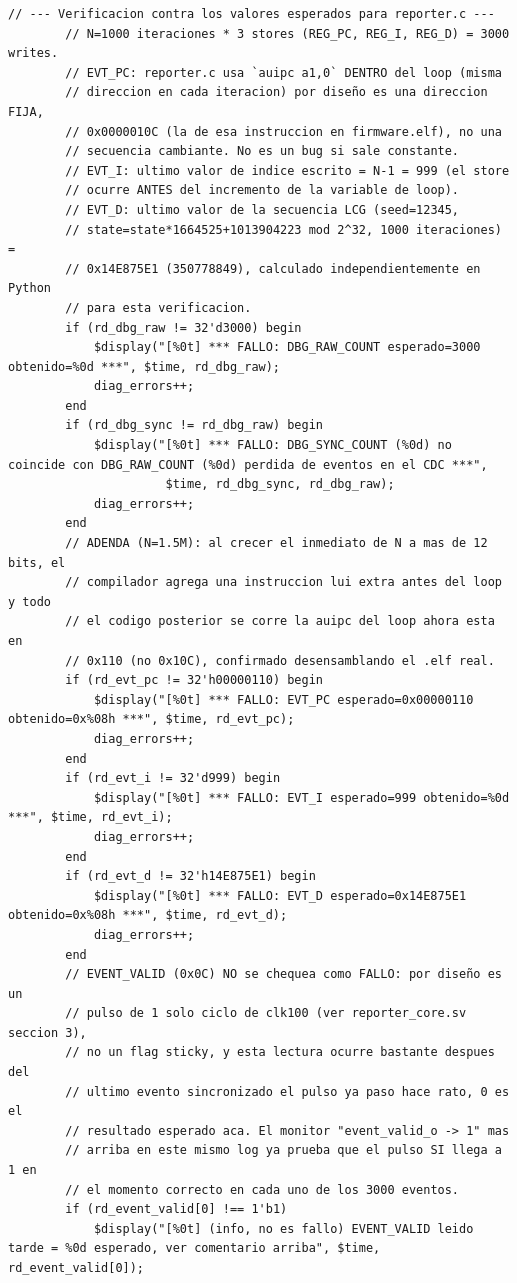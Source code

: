 \begin{lstlisting}[style=verilogstyle, basicstyle=\ttfamily\footnotesize, caption={Código fuente del subsistema \texttt{tb\_ibex\_bram\_subsystem.sv}}, label={code:tb_ibex_bram_subsystem.sv}]
        // --- Verificacion contra los valores esperados para reporter.c ---
        // N=1000 iteraciones * 3 stores (REG_PC, REG_I, REG_D) = 3000 writes.
        // EVT_PC: reporter.c usa `auipc a1,0` DENTRO del loop (misma
        // direccion en cada iteracion) por diseño es una direccion FIJA,
        // 0x0000010C (la de esa instruccion en firmware.elf), no una
        // secuencia cambiante. No es un bug si sale constante.
        // EVT_I: ultimo valor de indice escrito = N-1 = 999 (el store
        // ocurre ANTES del incremento de la variable de loop).
        // EVT_D: ultimo valor de la secuencia LCG (seed=12345,
        // state=state*1664525+1013904223 mod 2^32, 1000 iteraciones) =
        // 0x14E875E1 (350778849), calculado independientemente en Python
        // para esta verificacion.
        if (rd_dbg_raw != 32'd3000) begin
            $display("[%0t] *** FALLO: DBG_RAW_COUNT esperado=3000 obtenido=%0d ***", $time, rd_dbg_raw);
            diag_errors++;
        end
        if (rd_dbg_sync != rd_dbg_raw) begin
            $display("[%0t] *** FALLO: DBG_SYNC_COUNT (%0d) no coincide con DBG_RAW_COUNT (%0d) perdida de eventos en el CDC ***",
                      $time, rd_dbg_sync, rd_dbg_raw);
            diag_errors++;
        end
        // ADENDA (N=1.5M): al crecer el inmediato de N a mas de 12 bits, el
        // compilador agrega una instruccion lui extra antes del loop y todo
        // el codigo posterior se corre la auipc del loop ahora esta en
        // 0x110 (no 0x10C), confirmado desensamblando el .elf real.
        if (rd_evt_pc != 32'h00000110) begin
            $display("[%0t] *** FALLO: EVT_PC esperado=0x00000110 obtenido=0x%08h ***", $time, rd_evt_pc);
            diag_errors++;
        end
        if (rd_evt_i != 32'd999) begin
            $display("[%0t] *** FALLO: EVT_I esperado=999 obtenido=%0d ***", $time, rd_evt_i);
            diag_errors++;
        end
        if (rd_evt_d != 32'h14E875E1) begin
            $display("[%0t] *** FALLO: EVT_D esperado=0x14E875E1 obtenido=0x%08h ***", $time, rd_evt_d);
            diag_errors++;
        end
        // EVENT_VALID (0x0C) NO se chequea como FALLO: por diseño es un
        // pulso de 1 solo ciclo de clk100 (ver reporter_core.sv seccion 3),
        // no un flag sticky, y esta lectura ocurre bastante despues del
        // ultimo evento sincronizado el pulso ya paso hace rato, 0 es el
        // resultado esperado aca. El monitor "event_valid_o -> 1" mas
        // arriba en este mismo log ya prueba que el pulso SI llega a 1 en
        // el momento correcto en cada uno de los 3000 eventos.
        if (rd_event_valid[0] !== 1'b1)
            $display("[%0t] (info, no es fallo) EVENT_VALID leido tarde = %0d esperado, ver comentario arriba", $time, rd_event_valid[0]);


\end{lstlisting}
